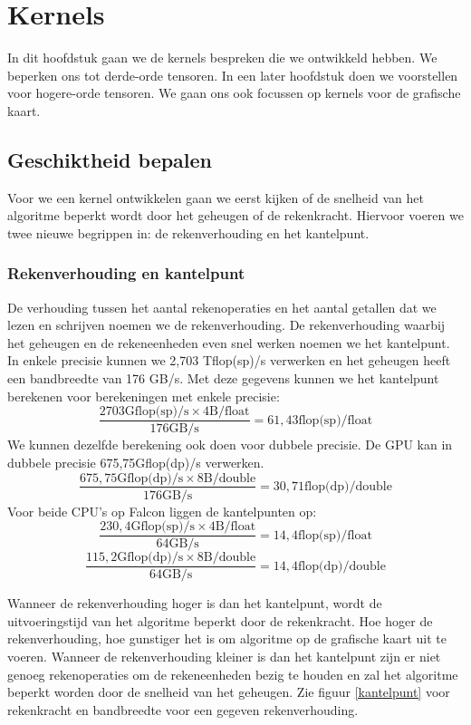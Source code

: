 \chapter{Kernels}
\label{h:kernels} 
In dit hoofdstuk gaan we de kernels bespreken die we ontwikkeld hebben. We beperken ons tot derde-orde tensoren. In een later hoofdstuk doen we voorstellen voor hogere-orde tensoren. We gaan ons ook focussen op kernels voor de grafische kaart.

\section{Geschiktheid bepalen}
Voor we een kernel ontwikkelen gaan we eerst kijken of de snelheid van het algoritme beperkt wordt door het geheugen of de rekenkracht. Hiervoor voeren we twee nieuwe begrippen in: de rekenverhouding en het kantelpunt.

\subsection{Rekenverhouding en kantelpunt}
De verhouding tussen het aantal rekenoperaties en het aantal getallen dat we lezen en schrijven noemen we de rekenverhouding. De rekenverhouding waarbij het geheugen en de rekeneenheden even snel werken noemen we het kantelpunt. In enkele precisie kunnen we 2,703 Tflop(sp)/s verwerken en het geheugen heeft een bandbreedte van 176 GB/s. Met deze gegevens kunnen we het kantelpunt berekenen voor berekeningen met enkele precisie:
\[
	\frac{2703 \text{Gflop(sp)/s} \times 4 \text{B/float}}
         {176 \text{GB/s}}										= 61,43 \text{flop(sp)/float}
\]
We kunnen dezelfde berekening ook doen voor dubbele precisie. De GPU kan in dubbele precisie 675,75Gflop(dp)/s verwerken.
\[
	\frac{675,75 \text{Gflop(dp)/s} \times 8 \text{B/double}}
         {176 \text{GB/s}}										= 30,71 \text{flop(dp)/double}
\]
Voor beide CPU's op Falcon liggen de kantelpunten op:
\[
	\frac{230,4 \text{Gflop(sp)/s} \times 4 \text{B/float}}
         {64 \text{GB/s}}										= 14,4 \text{flop(sp)/float}
\]
\[
	\frac{115,2 \text{Gflop(dp)/s} \times 8 \text{B/double}}
         {64 \text{GB/s}}										= 14,4 \text{flop(dp)/double}                                    
\]

Wanneer de rekenverhouding hoger is dan het kantelpunt, wordt de uitvoeringstijd van het algoritme beperkt door de rekenkracht. Hoe hoger de rekenverhouding, hoe gunstiger het is om algoritme op de grafische kaart uit te voeren. Wanneer de rekenverhouding kleiner is dan het kantelpunt zijn er niet genoeg rekenoperaties om de rekeneenheden bezig te houden en zal het algoritme beperkt worden door de snelheid van het geheugen. Zie figuur \ref{kantelpunt} voor rekenkracht en bandbreedte voor een gegeven rekenverhouding.

